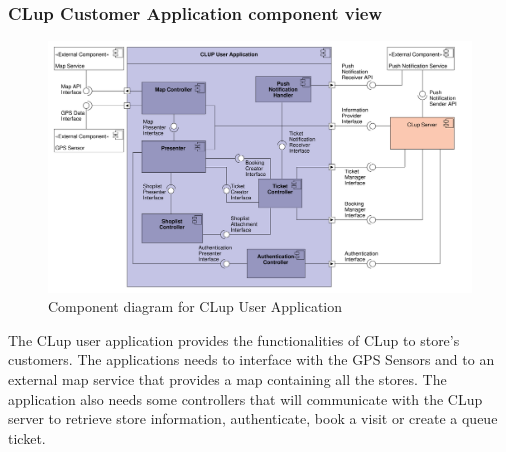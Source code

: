 \subsubsection{CLup Customer Application component view}
\begin{figure}[H]
    \includegraphics[width=\textwidth]{Images/UML_user_app_component.pdf}
    \caption{\label{fig:UML_comp_CLup_user_app}Component diagram for CLup User Application}
\end{figure}

The CLup user application provides the functionalities of CLup to store's customers. The applications needs to interface with the GPS Sensors and to an external map service that provides a map containing all the stores. The application also needs some controllers that will communicate with the CLup server to retrieve store information, authenticate, book a visit or create a queue ticket.

